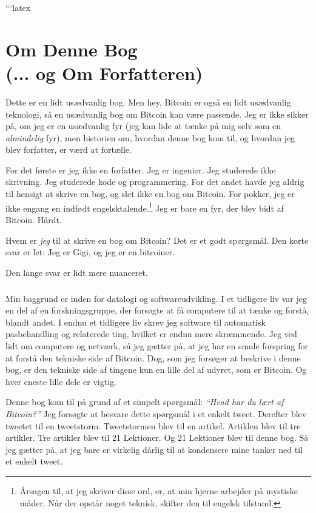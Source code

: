 ```latex
\def\bitcoinB{\leavevmode
  {\setbox0=\hbox{\textsf{B}}%
    \dimen0\ht0 \advance\dimen0 0.2ex
    \ooalign{\hfil \box0\hfil\cr
      \hfil\vrule height \dimen0 depth.2ex\hfil\cr
    }%
  }%
}

\chapter*{Om Denne Bog \\ (... og Om Forfatteren)}

Dette er en lidt usædvanlig bog. Men hey, Bitcoin er også en lidt usædvanlig
teknologi, så en usædvanlig bog om Bitcoin kan være passende. Jeg er ikke sikker
på, om jeg er en usædvanlig fyr (jeg kan lide at tænke på mig selv som en
\textit{almindelig} fyr), men historien om, hvordan denne bog kom til, og 
hvordan jeg blev forfatter, er værd at fortælle.

For det første er jeg ikke en forfatter. Jeg er ingeniør. Jeg studerede ikke
skrivning. Jeg studerede kode og programmering. For det andet havde jeg aldrig
til hensigt at skrive en bog, og slet ikke en bog om Bitcoin. For pokker, 
jeg er ikke engang en indfødt engelsktalende.\footnote{Årsagen til, at jeg
skriver disse ord, er, at min hjerne arbejder på mystiske måder. Når der opstår
noget teknisk, skifter den til engelsk tilstand.} Jeg er bare en fyr, der blev
bidt af Bitcoin. Hårdt.

Hvem er \textit{jeg} til at skrive en bog om Bitcoin? Det er et godt spørgsmål.
Den korte svar er let: Jeg er Gigi, og jeg er en bitcoiner.

Den lange svar er lidt mere nuanceret.

\paragraph{}
Min baggrund er inden for datalogi og softwareudvikling. I et
tidligere liv var jeg en del af en forskningsgruppe, der forsøgte at få
computere til at tænke og forstå, blandt andet. I endnu et tidligere liv skrev
jeg software til automatisk pasbehandling og relaterede ting, hvilket er endnu
mere skræmmende. Jeg ved lidt om computere og netværk, så jeg gætter på,
at jeg har en smule forspring for at forstå den tekniske side af Bitcoin.
Dog, som jeg forsøger at beskrive i denne bog, er den tekniske side af tingene
kun en lille del af udyret, som er Bitcoin. Og hver eneste lille dele er vigtig.

Denne bog kom til på grund af et simpelt spørgsmål: \textit{\enquote{Hvad har du
lært af Bitcoin?}} Jeg forsøgte at besvare dette spørgsmål i et enkelt tweet.
Derefter blev tweetet til en tweetstorm. Tweetstormen blev til en artikel.
Artiklen blev til tre artikler. Tre artikler blev til 21 Lektioner. Og 21
Lektioner blev til denne bog. Så jeg gætter på, at jeg bare er virkelig dårlig
til at kondensere mine tanker ned til et enkelt tweet.

